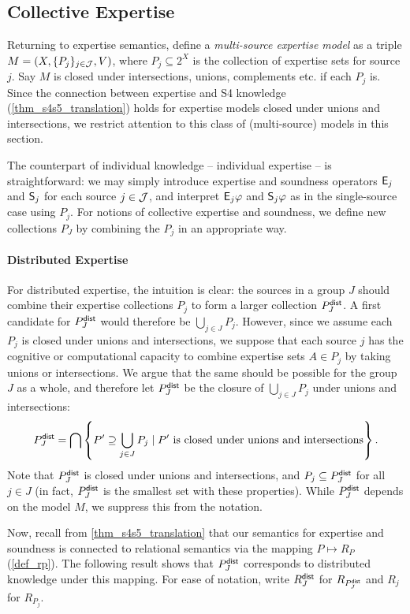 \subsection{Collective Expertise}

Returning to expertise semantics, define a \emph{multi-source expertise model}
as a triple $M = (X, \{P_j\}_{j \in \J}, V)$, where $P_j \subseteq 2^X$ is the
collection of expertise sets for source $j$. Say $M$ is closed under
intersections, unions, complements etc. if each $P_j$ is. Since the connection
between expertise and S4 knowledge (\cref{thm_s4s5_translation}) holds for
expertise models closed under unions and intersections, we restrict
attention to this class of (multi-source) models in this section.

The counterpart of individual knowledge -- individual expertise -- is
straightforward: we may simply introduce expertise and soundness operators
$\E_j$ and $\S_j$ for each source $j \in \J$, and interpret
$\E_j\phi$ and $\S_j\phi$ as in the single-source case using
$P_j$. For notions of collective expertise and soundness, we define new
collections $P_J$ by combining the $P_j$ in an appropriate way.

\paragraph{Distributed Expertise}

For distributed expertise, the intuition is clear: the sources in a group
$J$ should combine their expertise collections $P_j$ to form a
larger collection $\Pdist_J$. A first candidate for $\Pdist_J$
would therefore be $\bigcup_{j \in J}{P_j}$. However, since we assume
each $P_j$ is closed under unions and intersections, we suppose that each
source $j$ has the cognitive or computational capacity to combine expertise
sets $A \in P_j$ by taking unions or intersections. We argue that the
same should be possible for the group $J$ as a whole, and therefore let
$\Pdist_J$ be the closure of $\bigcup_{j \in J}{P_j}$ under unions
and intersections:
\[
\Pdist_J
= \bigcap\left\{
 P' \supseteq \bigcup_{j \in J}{P_j}
 \mid
 P' \text{ is closed under unions and intersections}
\right\}.\]
Note that $\Pdist_J$ is closed under unions and intersections, and
$P_j \subseteq \Pdist_J$ for all $j \in J$ (in fact,
$\Pdist_J$ is the smallest set with these properties). While
$\Pdist_J$ depends on the model $M$, we suppress this from the
notation.

Now, recall from \cref{thm_s4s5_translation} that our semantics for
expertise and soundness is connected to relational semantics via the mapping
$P \mapsto R_P$ (\cref{def_rp}). The following result shows that
$\Pdist_J$ corresponds to distributed knowledge under this mapping. For
ease of notation, write $\Rdist_J$ for $R_{\Pdist_J}$ and
$R_j$ for $R_{P_j}$.

